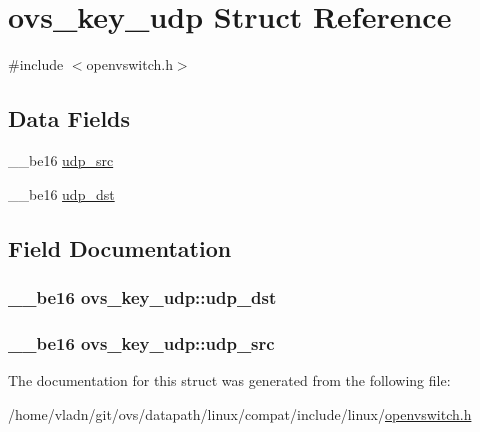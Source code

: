 \hypertarget{structovs__key__udp}{}\section{ovs\+\_\+key\+\_\+udp Struct Reference}
\label{structovs__key__udp}


{\ttfamily \#include $<$openvswitch.\+h$>$}

\subsection*{Data Fields}
\begin{DoxyCompactItemize}
\item 
\+\_\+\+\_\+be16 \hyperlink{structovs__key__udp_a771fb692264276a6e170a01d54295b61}{udp\+\_\+src}
\item 
\+\_\+\+\_\+be16 \hyperlink{structovs__key__udp_ab9a32a0e306acdbf2b5468710836a4d8}{udp\+\_\+dst}
\end{DoxyCompactItemize}


\subsection{Field Documentation}
\hypertarget{structovs__key__udp_ab9a32a0e306acdbf2b5468710836a4d8}{}
\subsubsection[{udp\+\_\+dst}]{\setlength{\rightskip}{0pt plus 5cm}\+\_\+\+\_\+be16 ovs\+\_\+key\+\_\+udp\+::udp\+\_\+dst}\label{structovs__key__udp_ab9a32a0e306acdbf2b5468710836a4d8}
\hypertarget{structovs__key__udp_a771fb692264276a6e170a01d54295b61}{}
\subsubsection[{udp\+\_\+src}]{\setlength{\rightskip}{0pt plus 5cm}\+\_\+\+\_\+be16 ovs\+\_\+key\+\_\+udp\+::udp\+\_\+src}\label{structovs__key__udp_a771fb692264276a6e170a01d54295b61}


The documentation for this struct was generated from the following file\+:\begin{DoxyCompactItemize}
\item 
/home/vladn/git/ovs/datapath/linux/compat/include/linux/\hyperlink{openvswitch_8h}{openvswitch.\+h}\end{DoxyCompactItemize}
